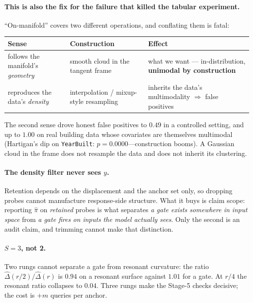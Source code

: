 \documentclass[11pt]{article}
\newcommand{\pihat}{\hat{\pi}}
\newcommand{\Dhat}{\hat{\Delta}}
\begin{document}
\paragraph{This is also the fix for the failure that killed the tabular experiment.}
``On-manifold'' covers two different operations, and conflating them is fatal:

\begin{table}[h]
\small\centering
\begin{tabular}{@{}p{}p{}p{}@{}}
\toprule
\textbf{\sffamily Sense} & \textbf{\sffamily Construction} & \textbf{\sffamily Effect}\\
\midrule
follows the manifold's \emph{geometry} & smooth cloud in the tangent frame
  & what we want --- in-distribution, \textbf{unimodal by construction}\\
reproduces the data's \emph{density} & interpolation / mixup-style resampling
  & inherits the data's multimodality $\Rightarrow$ false positives\\
\bottomrule
\end{tabular}
\end{table}

\noindent The second sense drove honest false positives to $0.49$ in a controlled setting, and up
to $1.00$ on real building data whose covariates are themselves multimodal (Hartigan's dip on
\texttt{YearBuilt}: $p = 0.0000$---construction booms). A Gaussian cloud in the frame does not
resample the data and does not inherit its clustering.

\paragraph{The density filter never sees $y$.} Retention depends on the displacement and the
anchor set only, so dropping probes cannot manufacture response-side structure. What it buys is
claim scope: reporting $\pihat$ on \emph{retained} probes is what separates \emph{a gate exists
somewhere in input space} from \emph{a gate fires on inputs the model actually sees}. Only the
second is an audit claim, and trimming cannot make that distinction.

\paragraph{$S = 3$, not 2.} Two rungs cannot separate a gate from resonant curvature: the ratio
$\Dhat(r/2)/\Dhat(r)$ is $0.94$ on a resonant surface against $1.01$ for a gate. At $r/4$ the
resonant ratio collapses to $0.04$. Three rungs make the Stage-5 checks decisive; the cost is
$+m$ queries per anchor.
\end{document}
